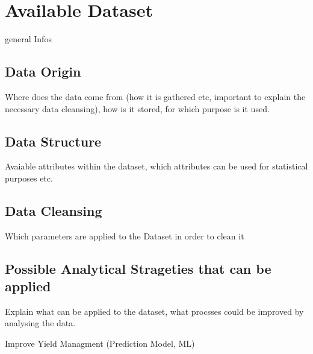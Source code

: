 %
%
% 
% 
% 

\chapter{Available Dataset}
\label{chap:introduction}
general Infos

\section{Data Origin}
Where does the data come from (how it is gathered etc, important to explain the necessary data cleansing), how is it stored, for which purpose is it used. 
\section{Data Structure}
Avaiable attributes within the dataset, which attributes can be used for statistical purposes etc.
\section{Data Cleansing}
Which parameters are applied to the Dataset in order to clean it
\section{Possible Analytical Strageties that can be applied }

Explain what can be applied to the dataset, what procsses could be improved by analysing the data. 

Improve Yield Managment  (Prediction Model, ML) 


